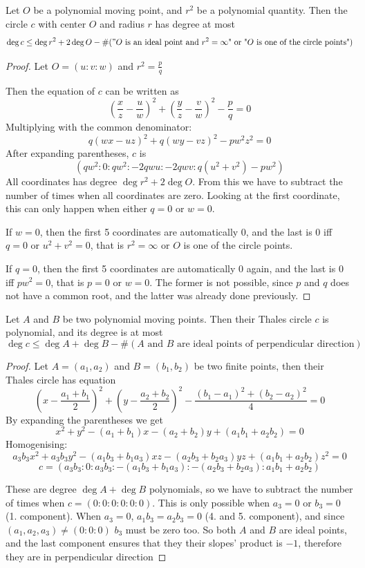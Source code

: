 \documentclass[a4paper]{article}
\begin{document}
\begin{theorem}
    Let $O$ be a polynomial moving point, and $r^2$ be a polynomial quantity. Then the circle $c$ with center $O$ and radius $r$ has degree at most
    $$\deg c\le \deg r^2+2\deg O-\#("\text{$O$ is an ideal point and $r^2=\infty$" or "$O$ is one of the circle points"})$$
\end{theorem}
\begin{proof}
    Let $O=(u:v:w)$ and $r^2=\frac{p}{q}$

    Then the equation of $c$ can be written as
    $$\left(\frac{x}{z}-\frac{u}{w}\right)^2+\left(\frac{y}{z}-\frac{v}{w}\right)^2-\frac{p}{q}=0$$
    Multiplying with the common denominator:
    $$q(wx-uz)^2+q(wy-vz)^2-pw^2z^2=0$$
    After expanding parentheses, $c$ is
    $$(qw^2:0:qw^2:-2qwu:-2qwv:q(u^2+v^2)-pw^2)$$
    All coordinates has degree $\deg r^2+2\deg O$. From this we have to subtract the number of times when all coordinates are zero. Looking at the first coordinate, this can only happen when either $q=0$ or $w=0$.

    If $w=0$, then the first 5 coordinates are automatically 0, and the last is 0 iff $q=0$ or $u^2+v^2=0$, that is $r^2=\infty$ or $O$ is one of the circle points.

    If $q=0$, then the first 5 coordinates are automatically 0 again, and the last is 0 iff $pw^2=0$, that is $p=0$ or $w=0$. The former is not possible, since $p$ and $q$ does not have a common root, and the latter was already done previously.
\end{proof}

\begin{theorem}
    Let $A$ and $B$ be two polynomial moving points. Then their Thales circle $c$ is polynomial, and its degree is at most
    $$\deg c\le \deg A+\deg B-\#(\text{$A$ and $B$ are ideal points of perpendicular direction})$$
\end{theorem}
\begin{proof}
    Let $A=(a_1,a_2)$ and $B=(b_1,b_2)$ be two finite points, then their Thales circle has equation
    $$\left(x - \frac{a_1 + b_1}{2}\right)^2 + \left(y - \frac{a_2 + b_2}{2}\right)^2
- \frac{(b_1 - a_1)^2 + (b_2 - a_2)^2}{4}=0$$
By expanding the parentheses we get
$$x^2 + y^2 - (a_1 + b_1)x - (a_2 + b_2)y + (a_1 b_1 + a_2 b_2) = 0$$
Homogenising:
$$a_3b_3x^2 + a_3b_3y^2 - (a_1b_3 + b_1a_3)xz - (a_2b_3 + b_2a_3)yz + (a_1 b_1 + a_2 b_2)z^2 = 0$$
$$c=(a_3b_3:0:a_3b_3:-(a_1b_3 + b_1a_3):-(a_2b_3 + b_2a_3):a_1 b_1 + a_2 b_2)$$

These are degree $\deg A+\deg B$ polynomials, so we have to subtract the number of times when $c=(0:0:0:0:0:0)$. This is only possible when $a_3=0$ or $b_3=0$ (1. component). When $a_3=0$, $a_1b_3=a_2b_3=0$ (4. and 5. component), and since $(a_1,a_2,a_3)\ne (0:0:0)$ $b_3$ must be zero too. So both $A$ and $B$ are ideal points, and the last component ensures that they their slopes' product is $-1$, therefore they are in perpendicular direction
\end{proof}
\end{document}
